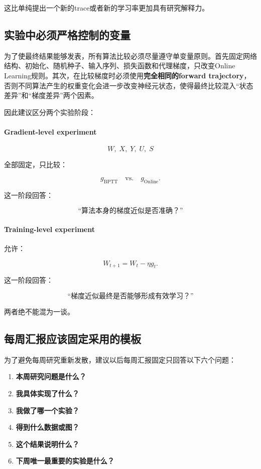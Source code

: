 \documentclass[journal,12pt,onecolumn]{IEEEtran}
\begin{document}
这比单纯提出一个新的trace或者新的学习率更加具有研究解释力。


\subsection{实验中必须严格控制的变量}

为了使最终结果能够发表，所有算法比较必须尽量遵守单变量原则。首先固定网络结构、初始化、随机种子、输入序列、损失函数和代理梯度，只改变Online Learning规则。其次，在比较梯度时必须使用\textbf{完全相同的forward trajectory}，否则不同算法产生的权重变化会进一步改变神经元状态，使得最终比较混入“状态差异”和“梯度差异”两个因素。

因此建议区分两个实验阶段：

\paragraph{Gradient-level experiment}

\[
W,\;X,\;Y,\;U,\;S
\]

全部固定，只比较：

\[
g_{\mathrm{BPTT}}
\quad
\text{vs.}
\quad
g_{\mathrm{Online}}.
\]

这一阶段回答：

\[
\text{“算法本身的梯度近似是否准确？”}
\]

\paragraph{Training-level experiment}

允许：

\[
W_{t+1}=W_t-\eta g_t.
\]

这一阶段回答：

\[
\text{“梯度近似最终是否能够形成有效学习？”}
\]

两者绝不能混为一谈。


\subsection{每周汇报应该固定采用的模板}

为了避免每周研究重新发散，建议以后每周汇报固定只回答以下六个问题：

\begin{enumerate}
    \item \textbf{本周研究问题是什么？}
    \item \textbf{我具体实现了什么？}
    \item \textbf{我做了哪一个实验？}
    \item \textbf{得到什么数据或图？}
    \item \textbf{这个结果说明什么？}
    \item \textbf{下周唯一最重要的实验是什么？}
\end{enumerate}
\end{document}

